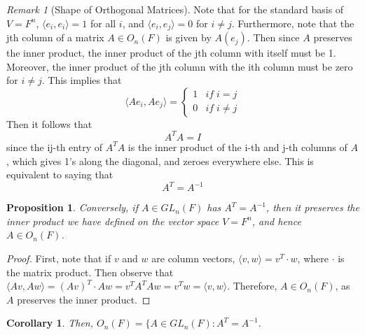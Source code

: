 \documentclass[12pt]{article}
\newtheorem{cor}[thm]{Corollary}
\newtheorem{prop}[thm]{Proposition}
\theoremstyle{definition}
\theoremstyle{remark}
\newtheorem{rmk}[thm]{Remark}
\numberwithin{equation}{section}
\begin{document}
\vspace{15pt}


\begin{rmk}[Shape of Orthogonal Matrices]
        Note that for the standard basis of $V = F^n$, $\langle e_i, e_i \rangle = 1$ for all $i$, and $\langle e_i, e_j \rangle = 0$ for $i \neq j$. Furthermore, note that the jth column of a matrix $A \in O_n(F)$ is given by $A(e_j)$. Then since $A$ preserves the inner product, the inner product of the jth column with itself must be 1. Moreover, the inner product of the jth column with the ith column must be zero for $i \neq j$. This implies that \begin{equation}
                \langle Ae_i,Ae_j\rangle = \left\{ \begin{array}{cc} 1 & if\;i=j \\ 0 & if\; i\neq j \end{array}\right.
        \end{equation}
        Then it follows that \begin{equation}
                A^TA = I
        \end{equation}
        since the ij-th entry of $A^TA$ is the inner product of the i-th and j-th columns of $A$, which gives 1's along the diagonal, and zeroes everywhere else. This is equivalent to saying that \begin{equation}
                A^T = A^{-1}
        \end{equation}
\end{rmk}


\vspace{15pt}


\begin{prop}
        Conversely, if $A \in GL_n(F)$ has $A^T = A^{-1}$, then it preserves the inner product we have defined on the vector space $V = F^n$, and hence $A \in O_n(F)$.
\end{prop}
\begin{proof}
        First, note that if $v$ and $w$ are column vectors, $\langle v, w \rangle = v^T\cdot w$, where $\cdot$ is the matrix product. Then observe that $\langle Av, Aw \rangle = (Av)^T\cdot Aw = v^TA^TAw = v^Tw = \langle v, w \rangle$. Therefore, $A \in O_n(F)$, as $A$ preserves the inner product. 
\end{proof}

\vspace{15pt}

\begin{cor}
        Then, $O_n(F) = \{A \in GL_n(F): A^T = A^{-1}$.
\end{cor}
\end{document}
